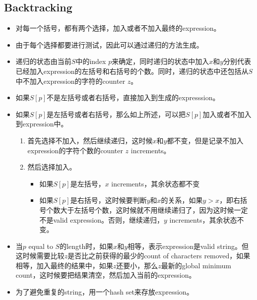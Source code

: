 \subsection{Backtracking}
\begin{itemize}
	\item 对每一个括号，都有两个选择，加入或者不加入最终的expression。
	\item 由于每个选择都要进行测试，因此可以通过递归的方法生成。
	\item 递归的状态由当前$S$中的index $p$来确定，同时递归的状态中加入$x$和$y$分别代表已经加入expression的左括号和右括号的个数。同时，递归的状态中还包括从$S$中不加入expression的字符的counter $z$。
	\item 如果$S[p]$不是左括号或者右括号，直接加入到生成的expresssion。
	\item 如果$S[p]$是左括号或者右括号，那么如上所述，可以把$S[p]$加入或者不加入到expression中。
	\begin{enumerate}
		\item 首先选择不加入，然后继续递归，这时候$x$和$y$都不变，但是记录不加入expression的字符个数的counter $z$ increments。
		\item 然后选择加入。
		\begin{itemize}
			\item 如果$S[p]$是左括号，$x$ increments，其余状态都不变
			\item 如果$S[p]$是右括号，这时候要判断$y$和$x$的关系，如果$y>x$，即右括号个数大于左括号个数，这时候就不用继续递归了，因为这时候一定不是valid expression。否则，继续递归，$y$ increments，其余状态不变。
		\end{itemize}
	\end{enumerate}
\item 当$p$ equal to $S$的length时，如果$x$和$y$相等，表示expression是valid string。但这时候需要比较$z$是否比之前获得的最少的count of characters removed，如果相等，加入最终的结果中，如果$z$还要小，那么$z$最新的global minimum count，这时候要把结果清空，然后加入当前的expression。
\item 为了避免重复的string，用一个hash set来存放expression。
\end{itemize}

